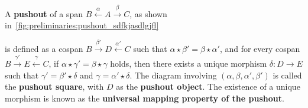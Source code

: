 \begin{definition}
    \label{def:cat:po} 
    A \textbf{pushout} of a span \( B \overset{\alpha}{\leftarrow} A \overset{\beta}{\rightarrow} C \), as shown in~\autoref{fig:preliminaries:pushout_sdfkjasdlgjfl}
    \begin{figure}
        \centering
        \caption{}
        \label{fig:preliminaries:pushout_sdfkjasdlgjfl}
    \end{figure}
    is defined as a cospan \( B \overset{\beta'}{\rightarrow} D \overset{\alpha'}{\leftarrow} C \) such that \( \alpha \star \beta' = \beta \star \alpha' \), and for every cospan \( B \overset{\gamma'}{\rightarrow} E \overset{\gamma}{\leftarrow} C \), if \( \alpha \star \gamma' = \beta \star \gamma \) holds, then there exists a unique morphism \(\delta : D \to E\) such that \( \gamma' = \beta' \star \delta \) and \( \gamma = \alpha' \star \delta \).
The diagram involving \( (\alpha, \beta, \alpha', \beta') \) is called the \textbf{pushout square}, with \(D\) as the \textbf{pushout object}. The existence of a unique morphism is known as the \textbf{universal mapping property of the pushout}.
\end{definition} 


